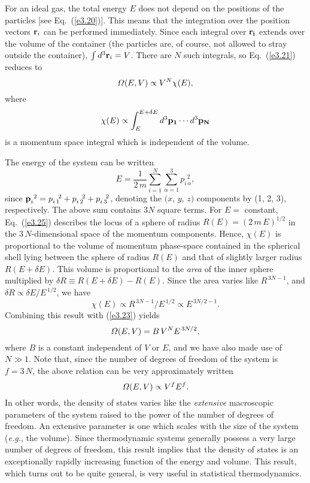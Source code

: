 For an ideal gas, the total energy $E$ does not depend on the positions of the
particles  [see Eq.~(\ref{e3.20})]. This means that the integration over the
 position vectors ${\bf r}_i$
can be performed immediately. Since each integral over ${\bf r_i}$ extends over
the volume of the container (the particles are, of course, not allowed to stray 
outside the container), $\int d^3{\bf r}_i= V$. There
are $N$ such integrals, so Eq.~(\ref{e3.21}) reduces to
\begin{equation}
{\mit\Omega}(E, V) \propto V^N \chi(E),\label{e3.23}
\end{equation}
where 
\begin{equation}
\chi(E) \propto \int^{E+\delta E}_E d^3 {\bf p_1}\cdots d^3 {\bf p_N}
\end{equation}
is a momentum space integral which is independent of the volume.

The energy of the system can be written
\begin{equation}
E = \frac{1}{2\,m} \sum_{i=1}^N \sum_{\alpha=1}^3 p_{i\,\alpha}^{~~2},\label{e3.25}
\end{equation}
since ${\bf p}_i^{~2} = p_{i\,1}^{~~2}+p_{i\,2}^{~~2}+p_{i\,3}^{~~2}$, 
denoting the $(x$, $y$,
$z)$ components by (1, 2, 3), respectively. The above sum contains $3N$ square terms.
For $E=$ constant, Eq.~(\ref{e3.25}) describes the locus of a
 sphere of radius $R(E) = (2\,m \,E)^{1/2}$ in
the $3\,N$-dimensional space of the momentum components. Hence, $\chi(E)$ is
proportional to the volume of momentum phase-space contained in the spherical
shell lying between the sphere of radius $R(E)$ and that of slightly larger
radius $R(E+\delta E)$. This volume is 
proportional to the {\em area}\/ of the inner sphere multiplied by  $\delta R \equiv
R(E+\delta E)- R(E)$.
Since the area varies like $R^{\,3N-1}$, and $\delta  R \propto \delta E/ E^{\,1/2}$,
we have
\begin{equation}
\chi(E) \propto R^{\,3N-1}/E^{\,1/2} \propto E^{\,3N/2-1}.
\end{equation}
 Combining this result with
(\ref{e3.23})  yields 
\begin{equation}
{\mit\Omega}(E, V) = B\,V^N E^{\,3N/2},
\end{equation}
where $B$ is a constant independent of $V$ or $E$, and we have also
made use of $N\gg 1$. Note that, since the number of degrees of freedom of the
system  is $f=3\,N$, the above relation can be very approximately written
\begin{equation}
{\mit\Omega}(E, V) \propto V^f E^f.
\end{equation}
In other words, the density of states varies like the {\em extensive}\/ 
macroscopic parameters of the system
raised to the power of the number of degrees of freedom. An extensive parameter is
one which scales with the size of the system ({\em e.g.}, the volume).
Since thermodynamic 
systems generally possess a very large number of degrees of freedom, this
result implies that the density of states
is an exceptionally rapidly increasing function of   
the energy and  volume.
This result, which turns out to be quite general, is very useful in statistical
thermodynamics. 



